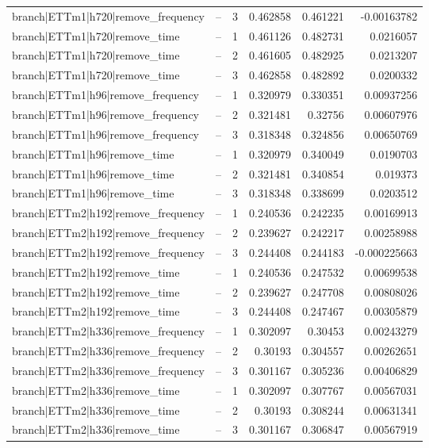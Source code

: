 \begin{longtable}{llrrrr}
branch|ETTm1|h720|remove\_frequency & -- & 3 & 0.462858 & 0.461221 & -0.00163782 \\
branch|ETTm1|h720|remove\_time & -- & 1 & 0.461126 & 0.482731 & 0.0216057 \\
branch|ETTm1|h720|remove\_time & -- & 2 & 0.461605 & 0.482925 & 0.0213207 \\
branch|ETTm1|h720|remove\_time & -- & 3 & 0.462858 & 0.482892 & 0.0200332 \\
branch|ETTm1|h96|remove\_frequency & -- & 1 & 0.320979 & 0.330351 & 0.00937256 \\
branch|ETTm1|h96|remove\_frequency & -- & 2 & 0.321481 & 0.32756 & 0.00607976 \\
branch|ETTm1|h96|remove\_frequency & -- & 3 & 0.318348 & 0.324856 & 0.00650769 \\
branch|ETTm1|h96|remove\_time & -- & 1 & 0.320979 & 0.340049 & 0.0190703 \\
branch|ETTm1|h96|remove\_time & -- & 2 & 0.321481 & 0.340854 & 0.019373 \\
branch|ETTm1|h96|remove\_time & -- & 3 & 0.318348 & 0.338699 & 0.0203512 \\
branch|ETTm2|h192|remove\_frequency & -- & 1 & 0.240536 & 0.242235 & 0.00169913 \\
branch|ETTm2|h192|remove\_frequency & -- & 2 & 0.239627 & 0.242217 & 0.00258988 \\
branch|ETTm2|h192|remove\_frequency & -- & 3 & 0.244408 & 0.244183 & -0.000225663 \\
branch|ETTm2|h192|remove\_time & -- & 1 & 0.240536 & 0.247532 & 0.00699538 \\
branch|ETTm2|h192|remove\_time & -- & 2 & 0.239627 & 0.247708 & 0.00808026 \\
branch|ETTm2|h192|remove\_time & -- & 3 & 0.244408 & 0.247467 & 0.00305879 \\
branch|ETTm2|h336|remove\_frequency & -- & 1 & 0.302097 & 0.30453 & 0.00243279 \\
branch|ETTm2|h336|remove\_frequency & -- & 2 & 0.30193 & 0.304557 & 0.00262651 \\
branch|ETTm2|h336|remove\_frequency & -- & 3 & 0.301167 & 0.305236 & 0.00406829 \\
branch|ETTm2|h336|remove\_time & -- & 1 & 0.302097 & 0.307767 & 0.00567031 \\
branch|ETTm2|h336|remove\_time & -- & 2 & 0.30193 & 0.308244 & 0.00631341 \\
branch|ETTm2|h336|remove\_time & -- & 3 & 0.301167 & 0.306847 & 0.00567919 \\

\end{longtable}
